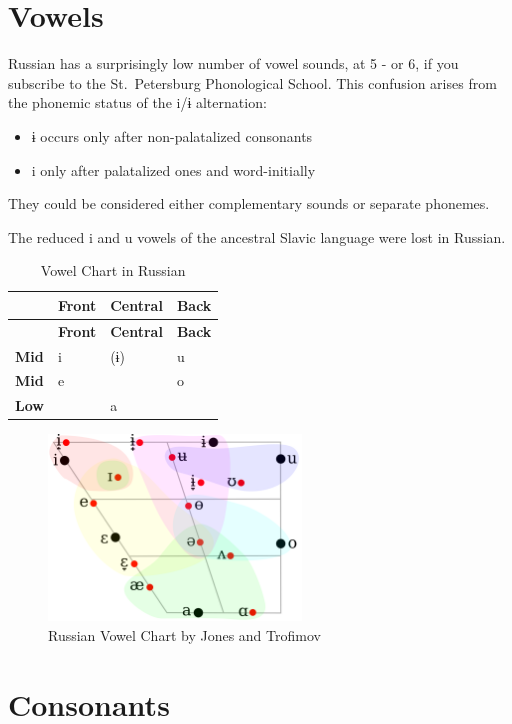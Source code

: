 \documentclass[
  a4paperpaper,
]{report}
\providecommand{\tightlist}{%
  \setlength{\itemsep}{0pt}\setlength{\parskip}{0pt}}
\begin{document}
\hypertarget{vowels}{%
\section{Vowels}\label{vowels}}

Russian has a surprisingly low number of vowel sounds, at 5 - or 6, if
you subscribe to the St.~Petersburg Phonological School. This confusion
arises from the phonemic status of the i/ɨ alternation:

\begin{itemize}
\tightlist
\item
  ɨ occurs only after non-palatalized consonants
\item
  i only after palatalized ones and word-initially
\end{itemize}

They could be considered either complementary sounds or separate
phonemes.

The reduced i and u vowels of the ancestral Slavic language were lost in
Russian.

\begin{longtable}[]{@{}llll@{}}
\caption{Vowel Chart in Russian}\tabularnewline
\toprule
& \textbf{Front} & \textbf{Central} & \textbf{Back}\tabularnewline
\midrule
\endfirsthead
\toprule
& \textbf{Front} & \textbf{Central} & \textbf{Back}\tabularnewline
\midrule
\endhead
\textbf{Mid} & i & (ɨ) & u\tabularnewline
\textbf{Mid} & e & & o\tabularnewline
\textbf{Low} & & a &\tabularnewline
\bottomrule
\end{longtable}

\begin{figure}
\centering
\includegraphics[width=0.6\textwidth,height=\textheight]{./vowels.png}
\caption{Russian Vowel Chart by Jones and Trofimov}
\end{figure}

\hypertarget{consonants}{%
\section{Consonants}\label{consonants}}
\end{document}
